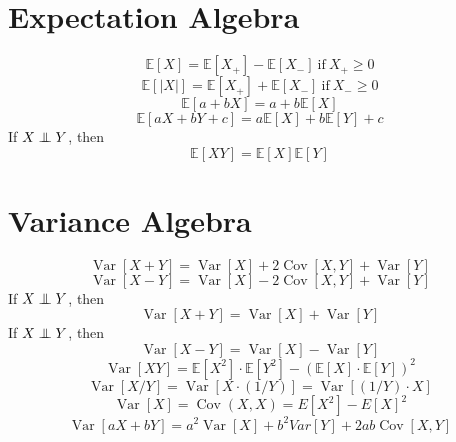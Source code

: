 \documentclass[twocolumn]{amsart}
\newcommand{\E}{\mathbb{E}}
\newcommand{\Cov}{\operatorname{Cov}}
\newcommand{\Var}{\operatorname{Var}}
\newcommand\independent{\protect\mathpalette{\protect\independenT}{\perp}}
\def\independenT#1#2{\mathrel{\rlap{$#1#2$}\mkern3mu{#1#2}}}
\begin{document}
\section*{Expectation Algebra}
\begin{equation*}
  \E[X]=\E[X_{+}] - \E[X_{-}]~\text{if}~X_{+} \geq 0
\end{equation*}
\begin{equation*}
  \E[|X|] = \E[X_{+}] + \E[X_{-}]~\text{if}~X_{-} \geq 0
\end{equation*}
\begin{equation*}
  \E[a+bX] = a + b\E[X]
\end{equation*}
\begin{equation*}
  \E[aX+bY+c] = a\E[X]+b\E[Y]+c
\end{equation*}
If \(X \independent Y\), then
\begin{equation*}
  \E[XY] = \E[X]\E[Y]
\end{equation*}

\section*{Variance Algebra}
\begin{equation*}
  \Var[X + Y] = \Var[X] + 2\Cov[X, Y] + \Var[Y]
\end{equation*}
\begin{equation*}
  \Var[X - Y] = \Var[X] - 2\Cov[X, Y] + \Var[Y]
\end{equation*}
If \(X \independent Y\), then
\begin{equation*}
  \Var[X + Y] = \Var[X] + \Var[Y]
\end{equation*}
If \(X \independent Y\), then
\begin{equation*}
  \Var[X - Y] = \Var[X] - \Var[Y]
\end{equation*}
\begin{equation*}
  \Var[XY] = \E[X^2] \cdot \E[Y^2] - {(\E[X] \cdot \E[Y])}^2
\end{equation*}
\begin{equation*}
  \Var[X/Y] = \Var[X \cdot (1/Y)] = \Var[(1/Y) \cdot X]
\end{equation*}
\begin{equation*}
  \Var[X] = \Cov(X, X) = E[X^2] - {E[X]}^2
\end{equation*}
\begin{equation*}
  \Var[aX+bY] = a^2\Var[X] + b^2 Var[Y] + 2ab\Cov[X,Y]
\end{equation*}
\end{document}
